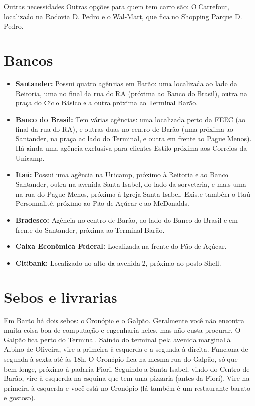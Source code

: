 \begin{story}{Outras necessidades}
Outras opções para quem tem carro são: O Carrefour, localizado na Rodovia D. Pedro e o Wal-Mart, que fica no Shopping Parque D. Pedro.

\section*{Bancos}

\begin{itemize}
\item \textbf{Santander:} Possui quatro agências em Barão: uma localizada ao lado da Reitoria, uma no final da rua do RA (próxima ao Banco do Brasil), outra na praça do Ciclo Básico e a outra próxima ao Terminal Barão.

\item \textbf{Banco do Brasil:} Tem várias agências: uma localizada perto da FEEC (ao final da rua do RA), e outras duas no centro de Barão (uma próxima ao Santander, na praça ao lado do Terminal, e outra em frente ao Pague Menos). Há ainda uma agência exclusiva para clientes Estilo próxima aos Correios da Unicamp.

\item \textbf{Itaú:} Possui uma agência na Unicamp, próximo à Reitoria e ao Banco Santander, outra na avenida Santa Isabel, do lado da sorveteria, e mais uma na rua do Pague Menos, próximo à Igreja Santa Isabel. Existe também o Itaú Personnalité, próximo ao Pão de Açúcar e ao McDonalds.

\item \textbf{Bradesco:} Agência no centro de Barão, do lado do Banco do Brasil e em frente do Santander, próxima ao Terminal Barão.

\item \textbf{Caixa Econômica Federal:} Localizada na frente do Pão de Açúcar.

\item  \textbf{Citibank:} Localizado no alto da avenida 2, próximo ao posto Shell.
\end{itemize}

\section*{Sebos e livrarias}

Em Barão há dois sebos: o Cronópio e o Galpão. Geralmente você não encontra muita coisa boa de computação e engenharia neles, mas não custa procurar. O Galpão fica perto do Terminal. Saindo do terminal pela avenida marginal à Albino de Oliveira, vire a primeira à esquerda e a segunda à direita. Funciona de segunda à sexta até às 18h. O Cronópio fica na mesma rua do Galpão, só que bem longe, próximo à padaria Fiori. Seguindo a Santa Isabel, vindo do Centro de Barão, vire à esquerda na esquina que tem uma pizzaria (antes da Fiori). Vire na primeira à esquerda e você está no Cronópio (lá também é um restaurante barato e gostoso).


\end{story}
